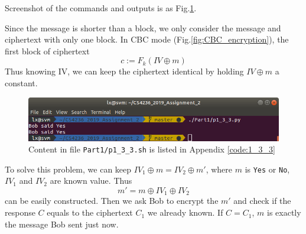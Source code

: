 Screenshot of the commands and outputs is as Fig.\ref{fig:p1_3_3}.

Since the message is shorter than a block, we only consider the message and ciphertext with only one block.
In CBC mode (Fig.\ref{fig:CBC_encryption}), the first block of ciphertext 
$$c := F_k(IV \oplus m)$$
Thus knowing IV, we can keep the ciphertext identical by holding $IV \oplus m$ a constant.

\begin{figure}[t!]
\centering
\includegraphics[width=\columnwidth]{pictures/p1_3_3.png}
\caption{
    Content in file \texttt{Part1/p1\_3\_3.sh} is listed in Appendix \ref{code:1_3_3}
}
\label{fig:p1_3_3}
\end{figure}

To solve this problem, we can keep $IV_1 \oplus m = IV_2 \oplus m'$, where $m$ is \texttt{Yes} or \texttt{No}, $IV_1$ and $IV_2$ are known value. Thus
$$ m' = m \oplus IV_1 \oplus IV_2 $$
can be easily constructed. Then we ask Bob to encrypt the $m'$ and check if the response $C$ equals to the ciphertext $C_1$ we already known. If $C = C_1$, $m$ is exactly the message Bob sent just now.
